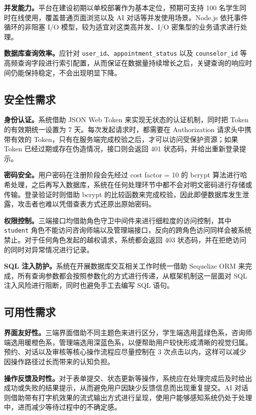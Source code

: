 \textbf{并发能力。}平台在建设初期以单校部署作为基本定位，预期可支持 100 名学生同时在线使用，覆盖普通页面浏览以及 AI 对话等并发使用场景。Node.js 依托事件循环的非阻塞 I/O 模型，较为适宜对这类高并发、I/O 密集型的业务请求进行处理。

\textbf{数据库查询效率。}应针对 \texttt{user\_id}、\texttt{appointment\_status} 以及 \texttt{counselor\_id} 等高频查询字段进行索引配置，从而保证在数据量持续增长之后，关键查询的响应时间仍能保持稳定，不会出现明显下降。

\subsection{安全性需求}

\textbf{身份认证。}系统借助 JSON Web Token 来实现无状态的认证机制，同时把 Token 的有效期统一设置为 7 天。每次发起请求时，都需要在 Authorization 请求头中携带有效的 Token，只有在服务端完成校验之后，才可以访问受保护资源；如果 Token 已经过期或存在伪造情况，接口则会返回 401 状态码，并给出重新登录提示。

\textbf{密码安全。}用户密码在注册阶段会先经过 cost factor = 10 的 bcrypt 算法进行哈希处理，之后再写入数据库，系统在任何处理环节中都不会对明文密码进行存储或传输。登录验证时则借助 bcrypt 的比较函数来完成校验，因此即便数据库发生泄露，攻击者也难以凭借查表方式还原出原始密码。

\textbf{权限控制。}三端接口均借助角色守卫中间件来进行细粒度的访问控制，其中 \texttt{student} 角色不能访问咨询师端以及管理端接口，反向的跨角色访问同样会被系统禁止。对于任何角色发起的越权请求，系统都会返回 403 状态码，并在拒绝访问的同时对异常情况进行记录。

\textbf{SQL 注入防护。}系统在开展数据库交互相关工作时统一借助 Sequelize ORM 来完成，所有查询参数都会按照参数化的方式进行传递，从框架机制这一层面对 SQL 注入风险进行阻断，同时也避免手工去编写 SQL 语句。

\subsection{可用性需求}

\textbf{界面友好性。}三端界面借助不同主题色来进行区分，学生端选用蓝绿色系，咨询师端选用暖橙色系，管理端选用深蓝色系，以便帮助用户较快形成清晰的视觉归属。预约、对话以及审核等核心操作流程应尽量控制在 3 次点击以内，这样可以减少因操作路径过长而带来的认知负担。

\textbf{操作反馈及时性。}对于表单提交、状态更新等操作，系统应在处理完成后及时给出成功或失败的结果提示，从而避免用户因缺少反馈信息而出现重复提交。AI 对话则借助带有打字机效果的流式输出方式进行呈现，使用户能够感知系统仍处于处理中，进而减少等待过程中的不确定感。

